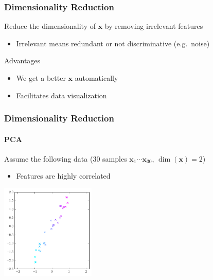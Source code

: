 \documentclass[xetex,professionalfont]{beamer}
\renewcommand{\vec}[1]{\ensuremath{\mathbf{#1}}}
\newcommand{\vx}{\vec{x}}
\begin{document}
\begin{frame}
\frametitle{Dimensionality Reduction}

Reduce the dimensionality of $\vx$ by removing irrelevant features  %
\begin{itemize}
    \item Irrelevant means redundant or not discriminative (e.g.\ noise)
\end{itemize}

\bigskip
Advantages
\begin{itemize}
    \item We get a better $\vx$ automatically
    \item Facilitates data visualization  %
\end{itemize}

\end{frame}


\begin{frame}
\frametitle{Dimensionality Reduction}
\framesubtitle{PCA}

Assume the following data (30 samples $\vx_1\cdots\vx_{30}$, $\dim(\vx)=2$)
\begin{itemize}
    \item Features are highly correlated
\end{itemize}

\begin{center}
\includegraphics[width=4.5cm]{figures/pca-original.pdf}
\end{center}

\end{frame}

\end{document}
